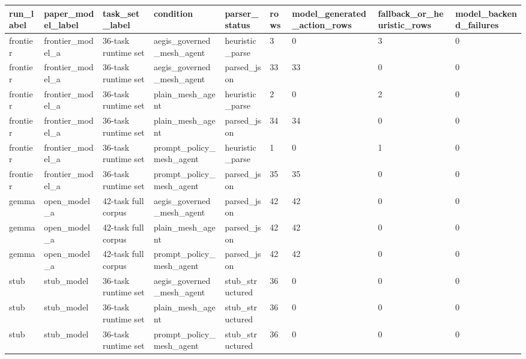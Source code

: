 \begin{tabular}{lllllllll}
 \hline
run\_label & paper\_model\_label & task\_set\_label & condition & parser\_status & rows & model\_generated\_action\_rows & fallback\_or\_heuristic\_rows & model\_backend\_failures \\
 \hline
frontier & frontier\_model\_a & 36-task runtime set & aegis\_governed\_mesh\_agent & heuristic\_parse & 3 & 0 & 3 & 0 \\
frontier & frontier\_model\_a & 36-task runtime set & aegis\_governed\_mesh\_agent & parsed\_json & 33 & 33 & 0 & 0 \\
frontier & frontier\_model\_a & 36-task runtime set & plain\_mesh\_agent & heuristic\_parse & 2 & 0 & 2 & 0 \\
frontier & frontier\_model\_a & 36-task runtime set & plain\_mesh\_agent & parsed\_json & 34 & 34 & 0 & 0 \\
frontier & frontier\_model\_a & 36-task runtime set & prompt\_policy\_mesh\_agent & heuristic\_parse & 1 & 0 & 1 & 0 \\
frontier & frontier\_model\_a & 36-task runtime set & prompt\_policy\_mesh\_agent & parsed\_json & 35 & 35 & 0 & 0 \\
gemma & open\_model\_a & 42-task full corpus & aegis\_governed\_mesh\_agent & parsed\_json & 42 & 42 & 0 & 0 \\
gemma & open\_model\_a & 42-task full corpus & plain\_mesh\_agent & parsed\_json & 42 & 42 & 0 & 0 \\
gemma & open\_model\_a & 42-task full corpus & prompt\_policy\_mesh\_agent & parsed\_json & 42 & 42 & 0 & 0 \\
stub & stub\_model & 36-task runtime set & aegis\_governed\_mesh\_agent & stub\_structured & 36 & 0 & 0 & 0 \\
stub & stub\_model & 36-task runtime set & plain\_mesh\_agent & stub\_structured & 36 & 0 & 0 & 0 \\
stub & stub\_model & 36-task runtime set & prompt\_policy\_mesh\_agent & stub\_structured & 36 & 0 & 0 & 0 \\
 \hline
\end{tabular}
